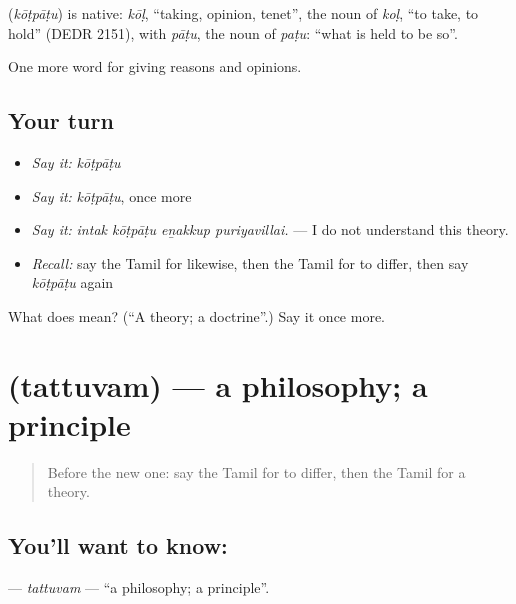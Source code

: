 \begin{cousinweb}
\textbf{} (\emph{kōṭpāṭu}) is native: \emph{kōḷ}, \textquotedblleft{}taking, opinion, tenet\textquotedblright{}, the noun of \emph{koḷ}, \textquotedblleft{}to take, to hold\textquotedblright{} (DEDR 2151), with \emph{pāṭu}, the noun of \emph{paṭu}: \textquotedblleft{}what is held to be so\textquotedblright{}.
\end{cousinweb}

\begin{grammarlens}[title={What you've built}]
One more word for giving reasons and opinions.
\end{grammarlens}

\subsection*{Your turn}
\begin{itemize}
\raggedright
  \item \emph{Say it:} \emph{kōṭpāṭu}
  \item \emph{Say it:} \emph{kōṭpāṭu}, once more
  \item \emph{Say it:} \emph{intak kōṭpāṭu eṉakkup puriyavillai.} — I do not understand this theory.
  \item \emph{Recall:} say the Tamil for likewise, then the Tamil for to differ, then say \emph{kōṭpāṭu} again
\end{itemize}

\begin{tcolorbox}[breakable,colback=teal!4,colframe=teal!35!black,title={Before you move on}]
What does  mean? (\textquotedblleft{}A theory; a doctrine\textquotedblright{}.) Say it once more.
\end{tcolorbox}
\section[\texorpdfstring{\ta{தத்துவம்} (tattuvam)}{தத்துவம் (tattuvam)}]{ (tattuvam) — a philosophy; a principle}

\label{lesson:TA-C358-tattuvam}



\begin{quote}
Before the new one: say the Tamil for to differ, then the Tamil for a theory.
\end{quote}

\subsection*{You'll want to know: }
\textbf{} — \emph{tattuvam} — \textquotedblleft{}a philosophy; a principle\textquotedblright{}.

